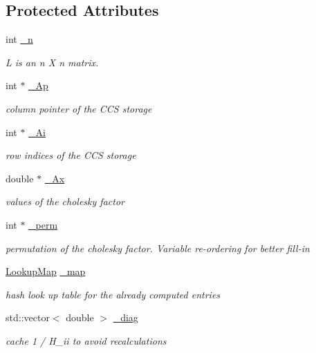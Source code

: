 \subsection*{Protected Attributes}
\begin{DoxyCompactItemize}
\item 
int \hyperlink{classg2o_1_1MarginalCovarianceCholesky_a086c541bde9958af88146788a9ac2611}{\+\_\+n}
\begin{DoxyCompactList}\small\item\em L is an n X n matrix. \end{DoxyCompactList}\item 
int $\ast$ \hyperlink{classg2o_1_1MarginalCovarianceCholesky_a5998463e23c716bb1abb02e9b3e40e0b}{\+\_\+\+Ap}
\begin{DoxyCompactList}\small\item\em column pointer of the C\+CS storage \end{DoxyCompactList}\item 
int $\ast$ \hyperlink{classg2o_1_1MarginalCovarianceCholesky_a516fa45fe98edfa0cc68fc2b0e0d5de4}{\+\_\+\+Ai}
\begin{DoxyCompactList}\small\item\em row indices of the C\+CS storage \end{DoxyCompactList}\item 
double $\ast$ \hyperlink{classg2o_1_1MarginalCovarianceCholesky_a2ac05a8c32b6a2e0cdb0b6a071a7552d}{\+\_\+\+Ax}
\begin{DoxyCompactList}\small\item\em values of the cholesky factor \end{DoxyCompactList}\item 
int $\ast$ \hyperlink{classg2o_1_1MarginalCovarianceCholesky_a404f5d0ce82c2877324bafb8997b96aa}{\+\_\+perm}
\begin{DoxyCompactList}\small\item\em permutation of the cholesky factor. Variable re-\/ordering for better fill-\/in \end{DoxyCompactList}\item 
\hyperlink{classg2o_1_1MarginalCovarianceCholesky_a9925dd2e45479a7feb783ff71d93fdbc}{Lookup\+Map} \hyperlink{classg2o_1_1MarginalCovarianceCholesky_a7a9d21e9ee6654b9e6d69a62e87c201a}{\+\_\+map}
\begin{DoxyCompactList}\small\item\em hash look up table for the already computed entries \end{DoxyCompactList}\item 
std\+::vector$<$ double $>$ \hyperlink{classg2o_1_1MarginalCovarianceCholesky_a6ceee33e0cde1d9a4888abab8b6ad712}{\+\_\+diag}
\begin{DoxyCompactList}\small\item\em cache 1 / H\+\_\+ii to avoid recalculations \end{DoxyCompactList}\end{DoxyCompactItemize}


